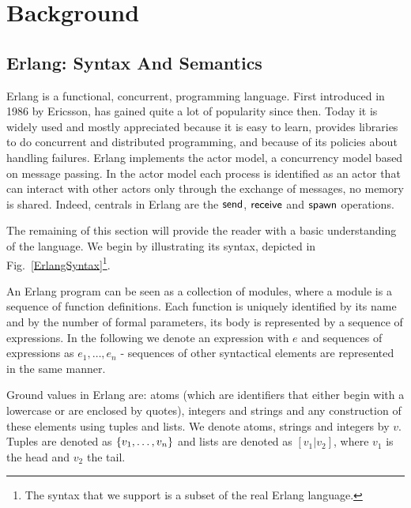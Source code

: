 \documentclass{article}[12pt,a4paper]
\theoremstyle{definition}
\begin{document}
\section{Background}\label{sec:background}

\subsection{Erlang: Syntax And Semantics}

Erlang is a functional, concurrent, programming language. First
introduced in 1986 by Ericsson, has gained quite a lot of popularity since then.
Today it is widely used and mostly appreciated because it is easy to learn,
provides libraries to do concurrent and distributed programming, and because of its
policies about handling failures. Erlang implements the actor model, a
concurrency model based on message passing. In the actor model each process is
identified as an actor that can interact with other actors only through the
exchange of messages, no memory is shared. Indeed, centrals in Erlang are the
$\mathsf{send}$, $\mathsf{receive}$ and $\mathsf{spawn}$ operations.

The remaining of this section will provide the reader with a basic understanding
of the language. We begin by illustrating its syntax, depicted in
Fig.~\ref{ErlangSyntax}\footnote{The syntax that we support is a subset of the
  real Erlang language.}. 

An Erlang program can be seen as a collection of modules, where a module is a sequence of function definitions. Each function is uniquely identified by its name and by the
number of formal parameters, its body is represented
by a sequence of expressions. In the following we denote an expression with $e$
and sequences of expressions as $e_1,\ldots,e_n$  - sequences of other
syntactical elements are represented in the same manner. 

Ground values in Erlang are: atoms (which are identifiers that either begin
with a lowercase or are enclosed by quotes), integers and strings and any
construction of these elements using tuples and lists. We denote atoms, strings and
integers by $v$. Tuples are denoted as
$\mathsf{\{}v_1,\ldots,v_n\mathsf{\}}$ and lists are denoted as  $[v_1|v_2]$, where
$v_1$ is the head and $v_2$ the tail.
\end{document}
